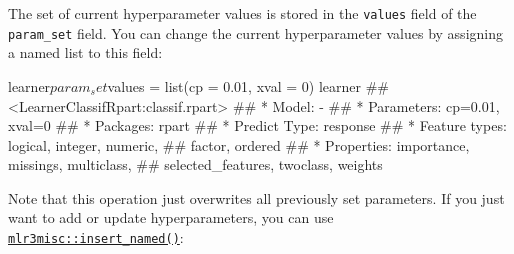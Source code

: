 \documentclass[]{article}
\newenvironment{Shaded}{}{}
\newcommand{\DataTypeTok}[1]{#1}
\newcommand{\DecValTok}[1]{#1}
\newcommand{\FloatTok}[1]{#1}
\newcommand{\KeywordTok}[1]{\textcolor[rgb]{0.00,0.00,1.00}{#1}}
\newcommand{\NormalTok}[1]{#1}
\newcommand{\OperatorTok}[1]{#1}
\newcommand{\StringTok}[1]{\textcolor[rgb]{0.00,0.50,0.50}{#1}}
\renewenvironment{Shaded} {\begin{snugshade}\small} {\end{snugshade}}
\begin{document}
\begin{Shaded}
\end{Shaded}

The set of current hyperparameter values is stored in the \texttt{values} field of the \texttt{param\_set} field.
You can change the current hyperparameter values by assigning a named list to this field:

\begin{Shaded}
\begin{Highlighting}[]
\NormalTok{learner}\OperatorTok{$}\NormalTok{param_set}\OperatorTok{$}\NormalTok{values =}\StringTok{ }\KeywordTok{list}\NormalTok{(}\DataTypeTok{cp =} \FloatTok{0.01}\NormalTok{, }\DataTypeTok{xval =} \DecValTok{0}\NormalTok{)}
\NormalTok{learner}
\NormalTok{## <LearnerClassifRpart:classif.rpart>}
\NormalTok{## * Model: -}
\NormalTok{## * Parameters: cp=0.01, xval=0}
\NormalTok{## * Packages: rpart}
\NormalTok{## * Predict Type: response}
\NormalTok{## * Feature types: logical, integer, numeric,}
\NormalTok{##   factor, ordered}
\NormalTok{## * Properties: importance, missings, multiclass,}
\NormalTok{##   selected_features, twoclass, weights}
\end{Highlighting}
\end{Shaded}

Note that this operation just overwrites all previously set parameters.
If you just want to add or update hyperparameters, you can use \href{https://mlr3misc.mlr-org.com/reference/insert_named.html}{\texttt{mlr3misc::insert\_named()}}:
\end{document}
